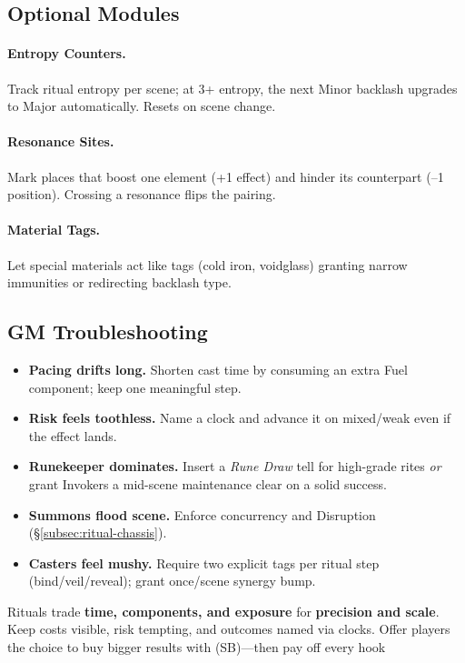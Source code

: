 \subsection{Optional Modules}\label{subsec:ritual-modules}
\paragraph{Entropy Counters.} Track ritual entropy per scene; at 3+ entropy, the next Minor backlash upgrades to Major automatically. Resets on scene change.
\paragraph{Resonance Sites.} Mark places that boost one element (+1 effect) and hinder its counterpart (–1 position). Crossing a resonance flips the pairing.
\paragraph{Material Tags.} Let special materials act like tags (cold iron, voidglass) granting narrow immunities or redirecting backlash type.

\subsection{GM Troubleshooting}\label{subsec:ritual-troubleshooting}
\begin{itemize}
\item \textbf{Pacing drifts long.} Shorten cast time by consuming an extra Fuel component; keep one meaningful step.
\item \textbf{Risk feels toothless.} Name a clock and advance it on mixed/weak even if the effect lands.
\item \textbf{Runekeeper dominates.} Insert a \emph{Rune Draw} tell for high-grade rites \emph{or} grant Invokers a mid-scene maintenance clear on a solid success.
\item \textbf{Summons flood scene.} Enforce concurrency and Disruption (\S\ref{subsec:ritual-chassis}).
\item \textbf{Casters feel mushy.} Require two explicit tags per ritual step (bind/veil/reveal); grant once/scene synergy bump.
\end{itemize}

\begin{tcolorbox}[title={Summary},colback=gray!5,colframe=black]
Rituals trade \textbf{time, components, and exposure} for \textbf{precision and scale}. Keep costs visible, risk tempting, and outcomes named via clocks. Offer players the choice to buy bigger results with (SB)—then pay off every hook
\end{tcolorbox}

